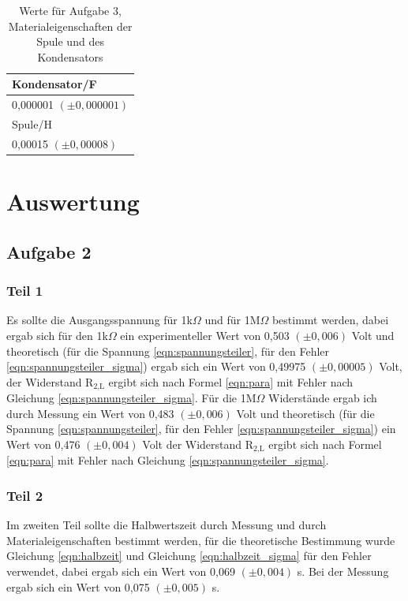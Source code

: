 \documentclass[12pt]{scrartcl}
\begin{document}
\begin{table}[htbp]
\caption{Werte für Aufgabe 3, Materialeigenschaften der Spule und des Kondensators}
\begin{center}
\begin{tabular}{|l|}
\hline
Kondensator/F \\ \hline
0,000001 $(\pm  0,000001)$ \\ \hline
Spule/H \\ \hline
0,00015 $(\pm 0,00008)$ \\ \hline
\end{tabular}
\end{center}
\label{tab:3}
\end{table}




\section{Auswertung}

\subsection{Aufgabe 2}

\subsubsection{Teil 1}
Es sollte die Ausgangsspannung für 1k$\Omega$ und für 1M$\Omega$ bestimmt werden, dabei ergab sich für den 1k$\Omega$ ein experimenteller Wert von 0,503 $(\pm 0,006)$ Volt und theoretisch (für die Spannung \ref{eqn:spannungsteiler}, für den Fehler \ref{eqn:spannungsteiler_sigma}) ergab sich ein Wert von 0,49975 $(\pm 0,00005)$ Volt, der Widerstand R$_\text{2,L}$ ergibt sich nach Formel \ref{eqn:para} mit Fehler nach Gleichung \ref{eqn:spannungsteiler_sigma}. Für die 1M$\Omega$ Widerstände ergab ich durch Messung ein Wert von 0,483 $(\pm 0,006)$ Volt und theoretisch (für die Spannung \ref{eqn:spannungsteiler}, für den Fehler \ref{eqn:spannungsteiler_sigma}) ein Wert von 0,476 $(\pm 0,004)$ Volt der Widerstand R$_\text{2,L}$ ergibt sich nach Formel \ref{eqn:para} mit Fehler nach Gleichung \ref{eqn:spannungsteiler_sigma}.

\subsubsection{Teil 2}
Im zweiten Teil sollte die Halbwertszeit durch Messung und durch Materialeigenschaften bestimmt werden, für die theoretische Bestimmung wurde Gleichung \ref{eqn:halbzeit} und Gleichung \ref{eqn:halbzeit_sigma} für den Fehler verwendet, dabei ergab sich ein Wert von 0,069	$(\pm 0,004)$ s. Bei der Messung ergab sich ein Wert von 0,075 $(\pm 0,005)$ s.
\end{document}
